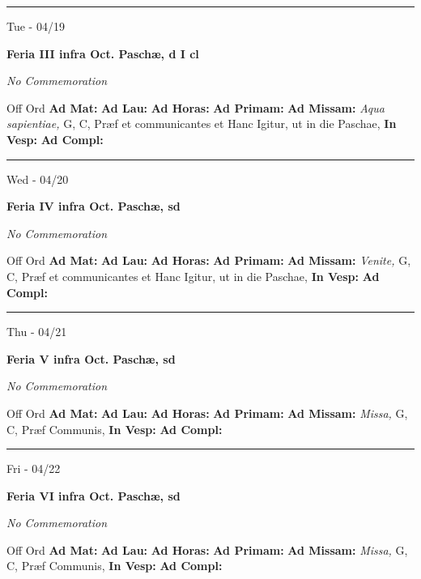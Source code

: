 \documentclass[letterpaper, 10pt]{article}
\begin{document}
\hrule
\begin{center}
Tue - 04/19
\end{center}\textbf{ \large Feria III infra Oct. Paschæ, \textnormal{\normalsize d I cl}}

\textit{No Commemoration}\begin{justify}
Off Ord
\textbf{Ad Mat: }
\textbf{Ad Lau: }
\textbf{Ad Horas: }
\textbf{Ad Primam: }
\textbf{Ad Missam:} \textit{Aqua sapientiae, } G, C, Præf et communicantes et Hanc Igitur, ut in die Paschae, 
\textbf{In Vesp: }
\textbf{Ad Compl: }\end{justify}



\hrule
\begin{center}
Wed - 04/20
\end{center}\textbf{ \large Feria IV infra Oct. Paschæ, \textnormal{\normalsize sd}}

\textit{No Commemoration}\begin{justify}
Off Ord
\textbf{Ad Mat: }
\textbf{Ad Lau: }
\textbf{Ad Horas: }
\textbf{Ad Primam: }
\textbf{Ad Missam:} \textit{Venite, } G, C, Præf et communicantes et Hanc Igitur, ut in die Paschae, 
\textbf{In Vesp: }
\textbf{Ad Compl: }\end{justify}



\hrule
\begin{center}
Thu - 04/21
\end{center}\textbf{ \large Feria V infra Oct. Paschæ, \textnormal{\normalsize sd}}

\textit{No Commemoration}\begin{justify}
Off Ord
\textbf{Ad Mat: }
\textbf{Ad Lau: }
\textbf{Ad Horas: }
\textbf{Ad Primam: }
\textbf{Ad Missam:} \textit{Missa, } G, C, Præf Communis, 
\textbf{In Vesp: }
\textbf{Ad Compl: }\end{justify}



\hrule
\begin{center}
Fri - 04/22
\end{center}\textbf{ \large Feria VI infra Oct. Paschæ, \textnormal{\normalsize sd}}

\textit{No Commemoration}\begin{justify}
Off Ord
\textbf{Ad Mat: }
\textbf{Ad Lau: }
\textbf{Ad Horas: }
\textbf{Ad Primam: }
\textbf{Ad Missam:} \textit{Missa, } G, C, Præf Communis, 
\textbf{In Vesp: }
\textbf{Ad Compl: }\end{justify}
\end{document}
